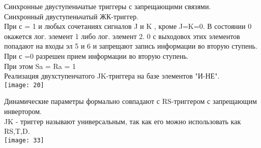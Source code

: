Синхронные двуступеньчатые триггеры с запрещающими связями.\\
Синхронный двуступеньчатый ЖК-триггер.\\

При с = 1 и любых сочетаниях сигналов J и K , кроме J=K=0. В состоянии 0 окажется лог. элемент 1 либо лог. элемент 2.
0 с выходовох этих элементов попадают на входы эл 5 и 6 и запрещают запись информации во вторую ступень.\\
При с =0 разрешен прием информации во вторую ступень.\\
При этом Sa = Ra = 1 \\
Реализация двухступенчатого JK-триггера на базе элементов "И-НЕ".\\
\texttt{[image: 20]}

Динамические параметры формально совпадают с RS-триггером с запрещающим инвертором.\\


JK - триггер называют универсальным, так как его можно использовать как RS,T,D.\\
\texttt{[image: 33]}
